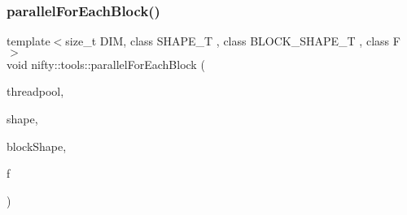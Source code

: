 \mbox{\label{namespacenifty_1_1tools_ac5e8d4b06486a3d603cdbb7314f8dd75}} 
\subsubsection{\texorpdfstring{parallel\+For\+Each\+Block()}{parallelForEachBlock()}}
{\footnotesize\ttfamily template$<$size\+\_\+t D\+IM, class S\+H\+A\+P\+E\+\_\+T , class B\+L\+O\+C\+K\+\_\+\+S\+H\+A\+P\+E\+\_\+T , class F $>$ \\
void nifty\+::tools\+::parallel\+For\+Each\+Block (\begin{DoxyParamCaption}\item[{\hyperlink{classnifty_1_1parallel_1_1ThreadPool}{parallel\+::\+Thread\+Pool} \&}]{threadpool,  }\item[{const \hyperlink{namespacenifty_1_1array_a683f151f19c851754e0c6d55ed16a0c2}{array\+::\+Static\+Array}$<$ S\+H\+A\+P\+E\+\_\+T, D\+IM $>$ \&}]{shape,  }\item[{const \hyperlink{namespacenifty_1_1array_a683f151f19c851754e0c6d55ed16a0c2}{array\+::\+Static\+Array}$<$ B\+L\+O\+C\+K\+\_\+\+S\+H\+A\+P\+E\+\_\+T, D\+IM $>$ \&}]{block\+Shape,  }\item[{F \&\&}]{f }\end{DoxyParamCaption})}

\mbox{\label{namespacenifty_1_1tools_af942eef6747790a4f8d6868b1f95c3ee}} 
